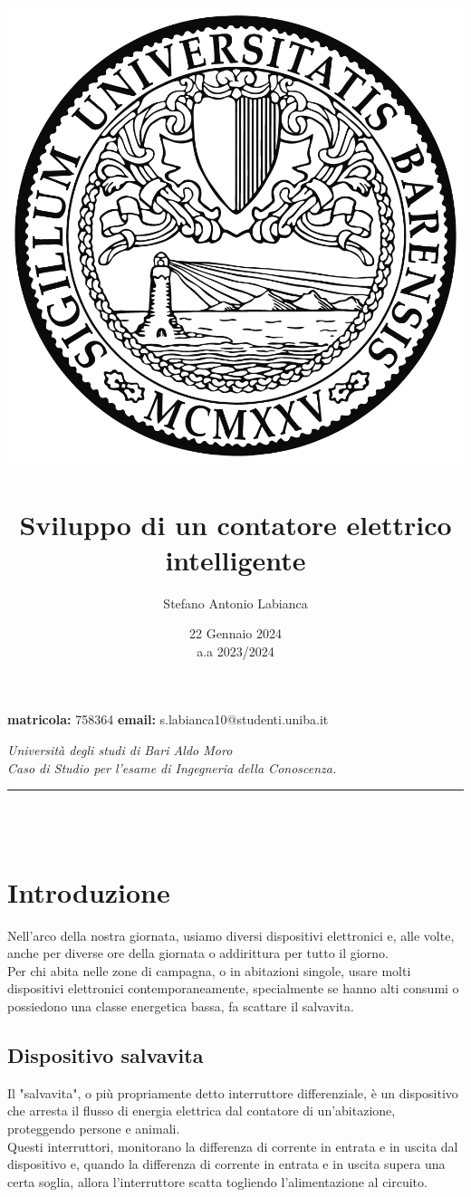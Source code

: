 \documentclass[12pt, letterpaper]{article}
\title{
    \includegraphics[scale=0.5]{unibalogo.jpg}~\\[1cm]
    \textbf{Sviluppo di un contatore elettrico intelligente}
}
\author{Stefano Antonio Labianca}
\date{22 Gennaio 2024 \\[0.125cm] a.a 2023/2024}
\begin{document}
\maketitle


\textbf{matricola: } 758364
\hfill
\textbf{email: } s.labianca10@studenti.uniba.it
\hfill \\
\begin{center}
      \textit{Università degli studi di Bari Aldo Moro} \\
      \textit{Caso di Studio per l'esame di Ingegneria della Conoscenza.}
\end{center}


\par\noindent\rule{\textwidth}{0.4pt}~\\[5cm]

\tableofcontents ~\\[5cm]

\section{Introduzione}

Nell'arco della nostra giornata, usiamo diversi dispositivi elettronici e,
alle volte, anche per diverse ore della giornata o addirittura per tutto
il giorno. \\ \break
Per chi abita nelle zone di campagna, o in abitazioni singole, usare molti
dispositivi elettronici contemporaneamente, specialmente se hanno alti consumi o
possiedono una classe energetica bassa, fa scattare il salvavita.

\subsection{Dispositivo salvavita}

Il "salvavita", o più propriamente detto interruttore differenziale, è un dispositivo
che arresta il flusso di energia elettrica dal contatore di
un'abitazione, proteggendo persone e animali. \\ \break
Questi interruttori, monitorano la differenza di corrente in entrata
e in uscita dal dispositivo e, quando la differenza di corrente in entrata e in
uscita supera una certa soglia, allora l'interruttore scatta togliendo l'alimentazione
al circuito.
\end{document}
